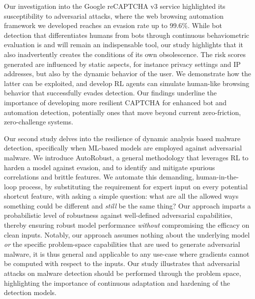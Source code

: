 Our investigation into the Google reCAPTCHA v3 service highlighted its susceptibility to adversarial attacks, where the web browsing automation framework we developed reaches an evasion rate up to 99.6\%.
While bot detection that differentiates humans from bots through continuous behaviometric evaluation is and will remain an indispensable tool, our study highlights that it also inadvertently creates the conditions of its own obsolescence.
The risk scores generated are influenced by static aspects, for instance privacy settings and IP addresses, but also by the dynamic behavior of the user.
We demonstrate how the latter can be exploited, and develop \gls{RL} agents can simulate human-like browsing behavior that successfully evades detection.
Our findings underline the importance of developing more resilient CAPTCHA for enhanced bot and automation detection, potentially ones that move beyond current zero-friction, zero-challenge systems.

Our second study delves into the resilience of dynamic analysis based malware detection, specifically when ML-based models are employed against adversarial malware.
We introduce AutoRobust, a general methodology that leverages \gls{RL} to harden a model against evasion, and to identify and mitigate spurious correlations and brittle features.
We automate this demanding, human-in-the-loop process, by substituting the requirement for expert input on every potential shortcut feature, with asking a simple question: what are all the allowed ways something could be different and \textit{still} be the same thing?
Our approach imparts a probabilistic level of robustness against well-defined adversarial capabilities, thereby ensuring robust model performance \textit{without} compromising the efficacy on clean inputs.
Notably, our approach assumes nothing about the underlying model \textit{or} the specific problem-space capabilities that are used to generate adversarial malware, it is thus general and applicable to any use-case where gradients cannot be computed with respect to the inputs.
Our study illustrates that adversarial attacks on malware detection should be performed through the problem space, highlighting the importance of continuous adaptation and hardening of the detection models.

